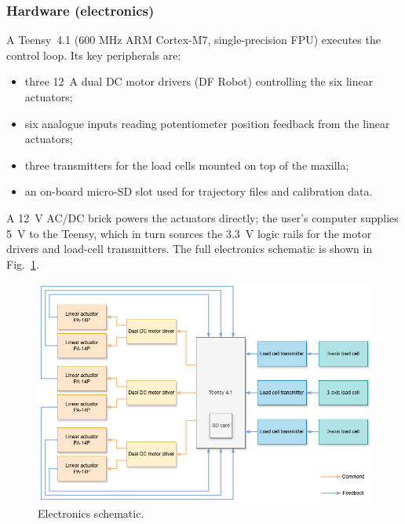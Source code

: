 \subsubsection{Hardware (electronics)}
A Teensy~4.1 (600 MHz ARM Cortex-M7, single-precision FPU) executes the control loop.%
Its key peripherals are:  
\begin{itemize}[nosep]
    \item three \SI{12}{\ampere} dual DC motor drivers (DF Robot) controlling the six linear actuators;
    \item six analogue inputs reading potentiometer position feedback from the linear actuators;
    \item three transmitters for the load cells mounted on top of the maxilla;
    \item an on-board micro-SD slot used for trajectory files and calibration data.
\end{itemize}
A \SI{12}{\volt} AC/DC brick powers the actuators directly; the user's computer supplies \SI{5}{\volt} to the Teensy, which in 
turn sources the \SI{3.3}{\volt} logic rails for the motor drivers and load-cell transmitters.
The full electronics schematic is shown in Fig.~\ref{fig:elec_schematic}.

\begin{figure}[H]
\centering
\includegraphics[width=\textwidth]{figures/elec_schematic.drawio.png}
\caption{Electronics schematic.}
\label{fig:elec_schematic}
\end{figure}

